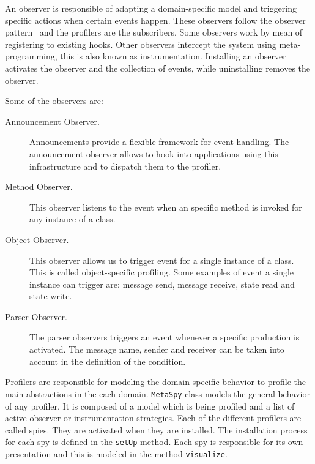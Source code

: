 \documentclass[runningheads]{llncs}
\newcommand{\ct}{\lstinline[backgroundcolor=\color{white},basicstyle=\footnotesize\ttfamily]}
\newcommand{\lr}[1]{\nb{Lukas}{orange}{#1}}
\begin{document}
An observer is responsible of adapting a domain-specific model and triggering specific actions when certain events happen.
These observers follow the observer pattern~\cite{Gamm95a} and the profilers are the subscribers.
Some observers work by mean of registering to existing hooks. Other observers intercept the system using meta-programming, this is also known as instrumentation.
Installing an observer activates the observer and the collection of events, while uninstalling removes the observer. 


Some of the observers are:
\begin{description}
	\item[Announcement Observer.] Announcements provide a flexible framework for event handling. The announcement observer allows to hook into applications using this infrastructure and to dispatch them to the profiler.
	\item[Method Observer.] This observer listens to the event when an specific method is invoked for any instance of a class.
	\item[Object Observer.] This observer allows us to trigger event for a single instance of a class. This is called object-specific profiling. Some examples of event a single instance can trigger are: message send, message receive, state read and state write.
	\item[Parser Observer.] The parser observers triggers an event whenever a specific production is activated.
	The message name, sender and receiver can be taken into account in the definition of the condition. 
\end{description}

Profilers are responsible for modeling the domain-specific behavior to profile the main abstractions in the each domain.
\ct{MetaSpy} class models the general behavior of any profiler. It is composed of a model which is being profiled and a list of active observer or instrumentation strategies.
Each of the different profilers are called spies. They are activated when they are installed. The installation process for each spy is defined in the \ct{setUp} method.
Each spy is responsible for its own presentation and this is modeled in the method \ct{visualize}.
\end{document}
